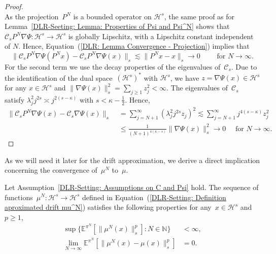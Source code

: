 \begin{proof}
\begin{equation*}
  \end{equation*}
  As the projection~$P^N$ is a bounded operator on $\mathcal{H}^s$, the same proof as for Lemma~\ref{DLR-Seeting: Lemma: Properties of Psi and Psi^N} shows that $\mathcal{C}_sP^N\nabla \Psi : \mathcal{H}^s \to \mathcal{H}^s$ is globally Lipschitz, with a Lipschitz constant independent of $N$. Hence, Equation~(\ref{DLR: Lemma Convergence - Projection}) implies that
  \begin{equation*}
    \|  \mathcal{C}_s P^N  \nabla  \Psi(P^Nx)  - \mathcal{C}_s P^N \nabla \Psi(x) \|_s \lesssim  \| P^N x - x \|_s \to 0 \qquad \text{ for } N \to \infty.
  \end{equation*}
  For the second term we use the decay properties of the eigenvalues of~$\mathcal{C}_s$. Due to the identification of the dual space~$(\mathcal{H}^s)^*$ with $\mathcal{H}^s$, we have $z = \nabla \Psi (x) \in \mathcal{H}^s$ for any $x \in \mathcal{H}^s$ and $\| \nabla \Psi (x) \|_s^2 = \sum_{j \geq 1} z_j^2 < \infty$. The eigenvalues of~$\mathcal{C}_s$ satisfy $\lambda_j^2 j^{2s} \asymp j^{2(s-\kappa)}$ with $s < \kappa - \tfrac{1}{2}$. Hence,
    \begin{equation*}
    \begin{split}
     \|  \mathcal{C}_s P^N  \nabla  \Psi(x)  - \mathcal{C}_s \nabla \Psi(x) \|_s  & \; = \sum_{j = N+1}^{\infty} (\lambda_j^2 j^{2s} z_j)^2 \lesssim \sum_{j = N+1}^{\infty} j^{4(s-\kappa)} z_j^2 \\
     & \; \leq \frac{1}{(N+1)^{4(\kappa - s)}} \| \nabla \Psi (x) \|_s^2 \to 0 \quad \text{ for } N \to \infty.
    \end{split}
  \end{equation*}

\end{proof}

As we will need it later for the drift approximation, we derive a direct implication concerning the convergence of~$\mu^N$ to~$\mu$.

\begin{cor}
  \label{DLR: Corollary mu^N to mu}
 Let Assumption~\ref{DLR-Setting: Assumptions on C and Psi} hold. The sequence of functions~$\mu^N: \mathcal{H}^s \to \mathcal{H}^s$ defined in Equation~(\ref{DLR-Setting: Definition aproximated drift mu^N}) satisfies the following properties for any~$x \in \mathcal{H}^s$ and $p \geq 1$,
 \begin{align}
   \label{DLR: Corollary mu^N to mu - claim1}
   \sup \{ \mathbb{E}^{\pi^N}[\| \mu^N(x) \|_s^p] : N \in \mathbb{N} \} & < \infty, \\
   \label{DLR: Corollary mu^N to mu - claim2}
   \lim_{N \to \infty} \mathbb{E}^{\pi^N} [\| \mu^N(x) - \mu(x) \|_s^p ] & = 0.
 \end{align}

\end{cor}

